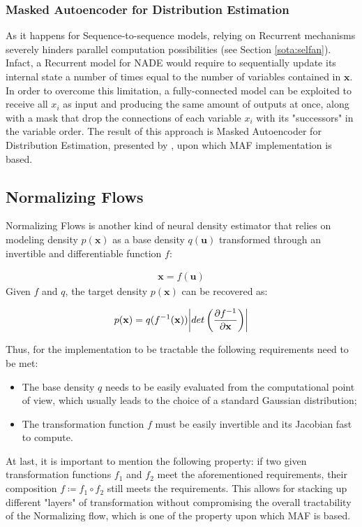             \subsubsection{Masked Autoencoder for Distribution Estimation}
                As it happens for Sequence-to-sequence models, relying on Recurrent mechanisms severely hinders parallel computation possibilities (see Section \ref{sota:selfan}). Infact, a Recurrent model for NADE would require to sequentially update its internal state a number of times equal to the number of variables contained in $\mathbf{x}$. In order to overcome this limitation, a fully-connected model can be exploited to receive all $x_i$ as input and producing the same amount of outputs at once, along with a mask that drop the connections of each variable $x_i$ with its "successors" in the variable order. The result of this approach is Masked Autoencoder for Distribution Estimation, presented by , upon which MAF implementation is based.
                
        \subsection{Normalizing Flows}
        \label{subs:norm_flows}
            Normalizing Flows is another kind of neural density estimator that relies on modeling density $p(\mathbf{x})$ as a base density $q(\mathbf{u})$ transformed through an invertible and differentiable function $f$:
            
            \begin{align}
                \mathbf{x} = f \left( \mathbf{u} \right) \label{eq:normflow}
            \end{align}
            Given $f$ and $q$, the target density $p(\mathbf{x})$ can be recovered as:
            
            \[ p(\mathbf{x}) = q(f^{-1}(\mathbf{x})) \abs*{ det \left( \frac{\partial f^{-1}}{\partial \mathbf{x}} \right) } \]
            
            Thus, for the implementation to be tractable the following requirements need to be met:
            \begin{itemize}
                \setlength\itemsep{0.05em}
                \item The base density $q$ needs to be easily evaluated from the computational point of view, which usually leads to the choice of a standard Gaussian distribution;
                \item The transformation function $f$ must be easily invertible and its Jacobian fast to compute.
            \end{itemize}
            At last, it is important to mention the following property: if two given  transformation functions $f_1$ and $f_2$ meet the aforementioned requirements, their composition $f \coloneqq f_1 \circ f_2$ still meets the requirements. This allows for stacking up different "layers" of transformation without compromising the overall tractability of the Normalizing flow, which is one of the property upon which MAF is based.
            
